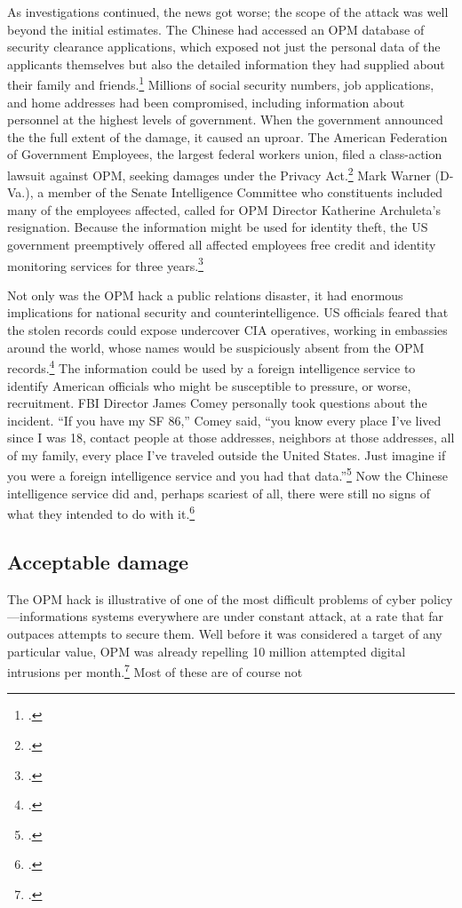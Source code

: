 \documentclass{memoir}
\begin{document}
\begin{refsegment}
As investigations continued, the news got worse; the scope of the attack was well beyond the initial estimates. The Chinese had accessed an OPM database of security clearance applications, which exposed not just the personal data of the applicants themselves but also the detailed information they had supplied about their family and friends.\footcite{nakashima_hacks_2015} Millions of social security numbers, job applications, and home addresses had been compromised, including information about personnel at the highest levels of government. When the government announced the the full extent of the damage, it caused an uproar. The American Federation of Government Employees, the largest federal workers union, filed a class-action lawsuit against OPM, seeking damages under the Privacy Act.\footcite[The lawsuits were later dismissed.]{chalfant_court_2017} Mark Warner (D-Va.), a member of the Senate Intelligence Committee who constituents included many of the employees affected, called for OPM Director Katherine Archuleta's resignation. Because the information might be used for identity theft, the US government preemptively offered all affected employees free credit and identity monitoring services for three years.\footcite{nakashima_hacks_2015}

Not only was the OPM hack a public relations disaster, it had enormous implications for national security and counterintelligence. US officials feared that the stolen records could expose undercover CIA operatives, working in embassies around the world, whose names would be suspiciously absent from the OPM records.\footcite{nakashima_hacks_2015} The information could be used by a foreign intelligence service to identify American officials who might be susceptible to pressure, or worse, recruitment. FBI Director James Comey personally took questions about the incident. ``If you have my SF 86,'' Comey said, ``you know every place I've lived since I was 18, contact people at those addresses, neighbors at those addresses, all of my family, every place I've traveled outside the United States. Just imagine if you were a foreign intelligence service and you had that data.''\footcite{nakashima_hacks_2015} Now the Chinese intelligence service did and, perhaps scariest of all, there were still no signs of what they intended to do with it.\footcite{koerner_inside_2016}

\subsection{Acceptable damage}
The OPM hack is illustrative of one of the most difficult problems of cyber policy---informations systems everywhere are under constant attack, at a rate that far outpaces attempts to secure them. Well before it was considered a target of any particular value, OPM was already repelling 10 million attempted digital intrusions per month.\footcite{koerner_inside_2016} Most of these are of course not


\end{refsegment}
\end{document}
